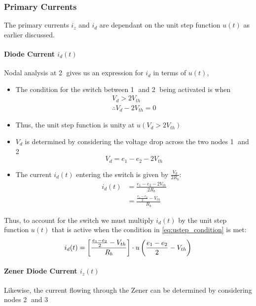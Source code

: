 \subsubsection{Primary Currents}
The primary currents $i_z$ and $i_d$ are dependant on the unit step function $u(t)$ as earlier discussed.
\paragraph{Diode Current $i_d(t)$} Nodal analysis at \textcircled{2} gives us an expression for $i_d$ in terms of $u(t)$,

\begin{itemize}
	\item The condition for the switch between \textcircled{1} and \textcircled{2} being activated is when
	\begin{equation}
 		\begin{split}
 			V_d > 2V_{th} \\
 			\therefore V_d - 2V_{th} = 0
 		\end{split}
 		\label{eq:ustep_condition}
 	\end{equation}
	\item Thus, the unit step function is unity at $u(V_d > 2V_{th})$
	\item $V_d$ is determined by considering the voltage drop across the two nodes \textcircled{1} and \textcircled{2} $$V_d = e_1 - e_2 - 2V_{th}$$
	\item The current $i_d(t)$ entering the switch is given by $\frac{V_d}{2R_b}$:
	\begin{equation}
		\begin{split}
			i_d(t) &= \frac{e_1 - e_2 - 2V_{th}}{2R_b} \\
				   &= \frac{\frac{e_1 - e_2}{2} - V_{th}}{R_b}	
		\end{split}
	\end{equation}
\end{itemize} 
Thus, to account for the switch we must multiply $i_d(t)$ by the unit step function $u(t)$ that is active when the condition in \eqref{eq:ustep_condition} is met:
\begin{equation}
	i_d(t) = \left[\frac{\frac{e_1 - e_2}{2} - V_{th}}{R_b} \right]\cdot u\left(\frac{e_1 - e_2}{2} - V_{th} \right)
	\label{eq:diode_current}
\end{equation}

\paragraph{Zener Diode Current $i_z(t)$}
Likewise, the current flowing through the Zener can be determined by considering nodes \textcircled{2} and \textcircled{3}

